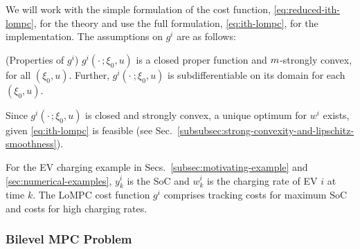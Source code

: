 We will work with the simple formulation of the cost function, \eqref{eq:reduced-ith-lompc}, for the theory and use the full formulation, \eqref{eq:ith-lompc}, for the implementation.
The assumptions on $g^i$ are as follows:
\begin{assumption} (Properties of $g^i$)
\label{assum:properties-of-gi}
    $g^i(\cdot \, ; \xi_0, u)$ is a closed proper function and $m$-strongly convex, for all $(\xi_0, u)$.
    Further, $g^i(\cdot \: ; \xi_0, u)$ is subdifferentiable on its domain for each $(\xi_0, u)$.
\end{assumption}
Since $g^i(\cdot \,; \xi_0, u)$ is closed and strongly convex, a unique optimum for $w^i$ exists, given \eqref{eq:ith-lompc} is feasible (see Sec.~\ref{subsubsec:strong-convexity-and-lipschitz-smoothness}).

For the EV charging example in Secs.~\ref{subsec:motivating-example} and \ref{sec:numerical-examples}, $y^i_k$ is the SoC and $w^i_k$ is the charging rate of EV $i$ at time $k$.
The LoMPC cost function $g^i$ comprises tracking costs for maximum SoC and costs for high charging rates.


\subsubsection{Bilevel MPC Problem}
\label{subsubsec:bilevel-mpc-problem}

